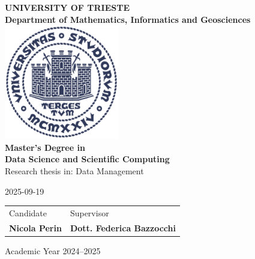 \begin{titlepage}
	\begin{center}
		{\LARGE {\bfseries UNIVERSITY OF TRIESTE \\}}
		{\Large {\bfseries Department of Mathematics, Informatics and Geosciences\\}}
		\vspace{1cm}
		\includegraphics[width=5cm,height=5cm]{img/units_logo.png}\\[1cm]
		
		\vfill
		{\Large \bfseries Master's Degree in\\}
		{\LARGE \bfseries Data Science and Scientific Computing \\}
		{\Large Research thesis in: Data Management \\}
		\vspace{1cm}
		
		{\huge \bfseries \thetitle}
		\vspace{1cm}
		
		{\large 2025-09-19 \\[1cm]}
		
		{\Large
			\setlength{\tabcolsep}{32pt}
			\begin{tabularx}{\linewidth}{ >{\raggedleft}X >{\raggedright\arraybackslash}X}
				Candidate & Supervisor \\
				\bfseries Nicola Perin & \bfseries Dott. Federica Bazzocchi\\ [5mm]
			\end{tabularx}
		}
		
		\vfill
		{\Large Academic Year 2024--2025}
	\end{center}
\end{titlepage}

\ClearShipoutPicture
\newgeometry{}
